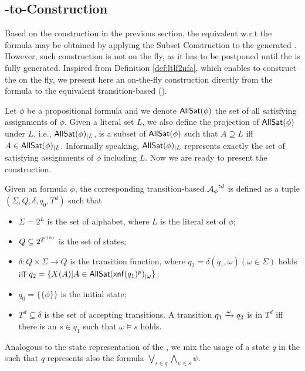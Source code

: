 \subsection{\ltlf-to-\DFA Construction}

Based on the \NFA construction in the previous section, the equivalent \DFA w.r.t the \ltlf formula may be obtained by applying the Subset Construction \cite{} to the generated \NFA. However, such \DFA construction is not on the fly, as it has to be postponed until the \NFA is fully generated. Inspired from Definition \ref{def:ltlf2nfa}, which enables to construct the \NFA on the fly, we present here an on-the-fly construction directly from the \ltlf formula to the equivalent transition-based \DFA (\TDFA). 

Let $\phi$ be a propositional formula and we denote ${\sf AllSat}(\phi)$ the set of all satisfying assignments of $\phi$. Given a literal set $L$, we also define the projection of ${\sf AllSat}(\phi)$ under $L$, i.e., ${\sf AllSat}(\phi)_{|L}$, is a subset of ${\sf AllSat}(\phi)$ such that $A\supseteq L$ iff $A\in {\sf AllSat}(\phi)_{|L}$. Informally speaking, ${\sf AllSat}(\phi)_{|L}$ represents exactly the set of satisfying assignments of $\phi$ including $L$. Now we are ready to present the \TDFA construction. 

\begin{definition}\label{def:ltlf2dfa}
Given an \ltlf formula $\phi$, the corresponding transition-based \DFA ${\mathcal{A}_{\phi}}^{td}$ is defined as a tuple $(\Sigma, Q, \delta, q_0, T^d)$ such that
\begin{itemize}
	\item $\Sigma = 2^{L}$ is the set of alphabet, where $L$ is the literal set of $\phi$;
	\item $Q\subseteq 2^{2^{{\sf cl}(\phi)}}$ is the set of states;
	\item $\delta:  Q \times \Sigma \to Q$ is the transition function, where $q_2 = \delta(q_1, \omega) (\omega \in \Sigma)$ holds iff $q_2=\{X(A) | A\in{\sf AllSat}({\sf xnf}(q_1)^p)_{|\omega}\}$;
	\item $q_0 = \{\{\phi \}\}$ is the initial state;
	\item $T^d\subseteq \delta$ is the set of accepting transitions. A transition $q_1\xrightarrow[]{\omega}q_2$ is in $T^d$ iff there is an $s\in q_1$ such that $\omega\models s$ holds. 
\end{itemize}

\end{definition}

Analogous to the state representation of the \TNFA, we mix the usage of a state $q$ in the \TDFA such that $q$ represents also the \ltlf formula $\bigvee_{s\in q}\bigwedge_{\psi\in s}\psi$. 

